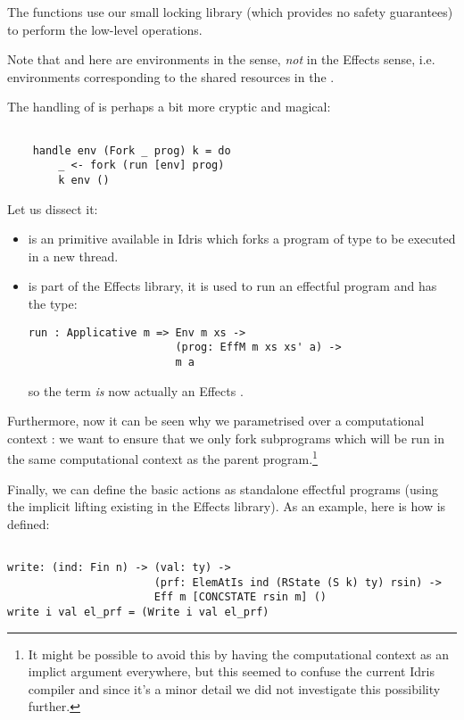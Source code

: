 The  functions use our small locking library (which provides no
safety guarantees) to perform the low-level operations.

Note that  and  here are environments in the
 sense, \emph{not} in the Effects sense, i.e. environments
corresponding to the shared resources in the .

The handling of  is perhaps a bit more cryptic and magical:

\begin{BVerbatim}

    handle env (Fork _ prog) k = do
        _ <- fork (run [env] prog)
        k env ()

\end{BVerbatim}

Let us dissect it:

\begin{itemize}
    \item {} is an  primitive available in Idris which forks
        a program of type  to be executed in a new thread.
    \item {} is part of the Effects library, it is used to run an
    effectful program and has the type:
    \begin{Verbatim}
run : Applicative m => Env m xs ->
                       (prog: EffM m xs xs' a) ->
                       m a
    \end{Verbatim}
    so the term \code{[env]} \emph{is} now actually an Effects .
\end{itemize}

Furthermore, now it can be seen why we parametrised  over
a computational context : we want to ensure that we only
fork  subprograms which will be run in the same computational
context as the parent  program.\footnote{It might be possible to avoid
this by having the computational context as an implict argument everywhere, but
this seemed to confuse the current Idris compiler and since it's a minor detail
we did not investigate this possibility further.}

Finally, we can define the basic actions as standalone effectful programs
(using the implicit lifting existing in the Effects library).
As an example, here is how  is defined:

\begin{BVerbatim}

write: (ind: Fin n) -> (val: ty) ->
                       (prf: ElemAtIs ind (RState (S k) ty) rsin) ->
                       Eff m [CONCSTATE rsin m] ()
write i val el_prf = (Write i val el_prf)

\end{BVerbatim}

